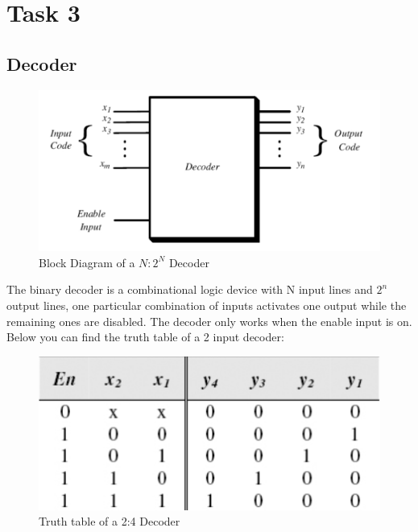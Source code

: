 

\section*{Task 3}

\subsection*{Decoder}

\begin{figure}[H]
  \begin{centering}
  \includegraphics[scale=1]{data/decoder.png}
  \par\end{centering}
  \caption{Block Diagram of a $N:2^{N}$ Decoder}
\end{figure}


The binary decoder is a combinational logic device with N input lines and $2^{n}$ output lines, one particular combination of inputs activates one output while the remaining ones are disabled. The decoder only works when the enable input is on. Below you can find the truth table of a 2 input decoder:

\begin{figure}[H]
  \begin{centering}
  \includegraphics[scale=1]{data/decodertable.png}
  \par\end{centering}
  \caption{Truth table of a 2:4 Decoder}
\end{figure}

